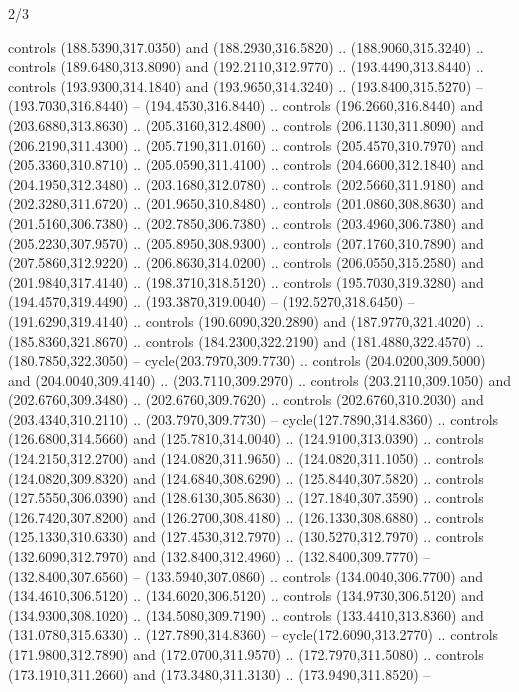 \begin{flagdescription}{2/3}
\begin{scope}[xshift=0.5\flaglength,yshift=0.5\flagwidth,scale=\stretchfactor]
\begin{scope}[scale=0.001645\flagwidth,yshift=65mm,xshift=-63mm]
\begin{scope}[y=0.80pt, x=0.80pt, yscale=-1,]
\begin{scope}[cm={{1.33333,0.0,0.0,1.33333,(0.0,1e-05)}}]
  controls (188.5390,317.0350) and (188.2930,316.5820) .. (188.9060,315.3240) ..
  controls (189.6480,313.8090) and (192.2110,312.9770) .. (193.4490,313.8440) ..
  controls (193.9300,314.1840) and (193.9650,314.3240) .. (193.8400,315.5270) --
  (193.7030,316.8440) -- (194.4530,316.8440) .. controls (196.2660,316.8440) and
  (203.6880,313.8630) .. (205.3160,312.4800) .. controls (206.1130,311.8090) and
  (206.2190,311.4300) .. (205.7190,311.0160) .. controls (205.4570,310.7970) and
  (205.3360,310.8710) .. (205.0590,311.4100) .. controls (204.6600,312.1840) and
  (204.1950,312.3480) .. (203.1680,312.0780) .. controls (202.5660,311.9180) and
  (202.3280,311.6720) .. (201.9650,310.8480) .. controls (201.0860,308.8630) and
  (201.5160,306.7380) .. (202.7850,306.7380) .. controls (203.4960,306.7380) and
  (205.2230,307.9570) .. (205.8950,308.9300) .. controls (207.1760,310.7890) and
  (207.5860,312.9220) .. (206.8630,314.0200) .. controls (206.0550,315.2580) and
  (201.9840,317.4140) .. (198.3710,318.5120) .. controls (195.7030,319.3280) and
  (194.4570,319.4490) .. (193.3870,319.0040) -- (192.5270,318.6450) --
  (191.6290,319.4140) .. controls (190.6090,320.2890) and (187.9770,321.4020) ..
  (185.8360,321.8670) .. controls (184.2300,322.2190) and (181.4880,322.4570) ..
  (180.7850,322.3050) -- cycle(203.7970,309.7730) .. controls
  (204.0200,309.5000) and (204.0040,309.4140) .. (203.7110,309.2970) .. controls
  (203.2110,309.1050) and (202.6760,309.3480) .. (202.6760,309.7620) .. controls
  (202.6760,310.2030) and (203.4340,310.2110) .. (203.7970,309.7730) --
  cycle(127.7890,314.8360) .. controls (126.6800,314.5660) and
  (125.7810,314.0040) .. (124.9100,313.0390) .. controls (124.2150,312.2700) and
  (124.0820,311.9650) .. (124.0820,311.1050) .. controls (124.0820,309.8320) and
  (124.6840,308.6290) .. (125.8440,307.5820) .. controls (127.5550,306.0390) and
  (128.6130,305.8630) .. (127.1840,307.3590) .. controls (126.7420,307.8200) and
  (126.2700,308.4180) .. (126.1330,308.6880) .. controls (125.1330,310.6330) and
  (127.4530,312.7970) .. (130.5270,312.7970) .. controls (132.6090,312.7970) and
  (132.8400,312.4960) .. (132.8400,309.7770) -- (132.8400,307.6560) --
  (133.5940,307.0860) .. controls (134.0040,306.7700) and (134.4610,306.5120) ..
  (134.6020,306.5120) .. controls (134.9730,306.5120) and (134.9300,308.1020) ..
  (134.5080,309.7190) .. controls (133.4410,313.8360) and (131.0780,315.6330) ..
  (127.7890,314.8360) -- cycle(172.6090,313.2770) .. controls
  (171.9800,312.7890) and (172.0700,311.9570) .. (172.7970,311.5080) .. controls
  (173.1910,311.2660) and (173.3480,311.3130) .. (173.9490,311.8520) --

\end{scope}
\end{scope}
\end{scope}
\end{scope}
\end{flagdescription}
